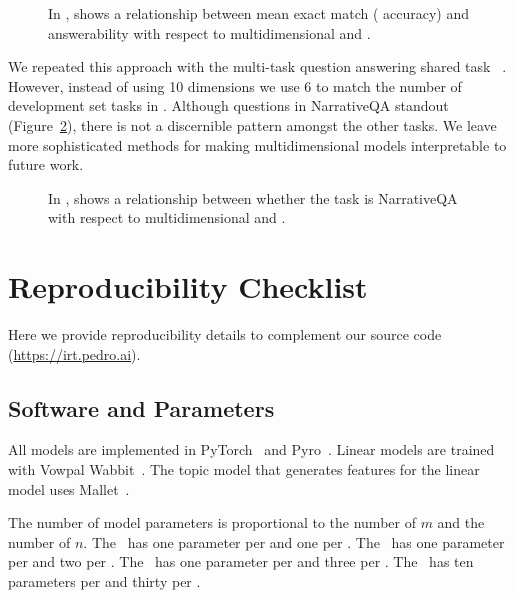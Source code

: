 \begin{figure}[t]
  \centering
  \caption{
    In \squad{},  shows a relationship between mean exact match (\itm{} accuracy) and answerability with respect to multidimensional \diff{} and \discability{}.
  }
  \label{fig:tsne-squad}
\end{figure}

We repeated this approach with the multi-task question answering shared task ~\citep{fisch2019mrqa}.
However, instead of using 10 dimensions we use 6 to match the number of development set tasks in .
Although questions in NarrativeQA standout (Figure~\ref{fig:tsne-mrqa}), there is not a discernible pattern amongst the other tasks.
We leave more sophisticated methods for making multidimensional \irt{} models interpretable to future work.

\begin{figure}[t]
  \centering
  \caption{
    In ,  shows a relationship between whether the task is NarrativeQA with respect to multidimensional \diff{} and \discability{}.
  }
  \label{fig:tsne-mrqa}
\end{figure}



\section{Reproducibility Checklist}

Here we provide reproducibility details to complement our source code (\href{https://irt.pedro.ai}{https://irt.pedro.ai}).

\subsection{Software and Parameters}

All \irt{} models are implemented in PyTorch~\citep{pytorch2019} and Pyro~\citep{bingham2018pyro}.
Linear models are trained with Vowpal Wabbit~\citep{Agarwal2014ARE}.
The topic model that generates features for the linear model uses Mallet~\citep{McCallumMALLET}.

The number of \irt{} model parameters is proportional to the number of \subjs{} $m$ and the number of \itms{} $n$.
The ~has one parameter per \subj{} and one per \itm{}.
The ~has one parameter per \subj{} and two per \itm{}.
The ~has one parameter per \subj{} and three per \itm{}.
The ~has ten parameters per \subj{} and thirty per \itm{}.

